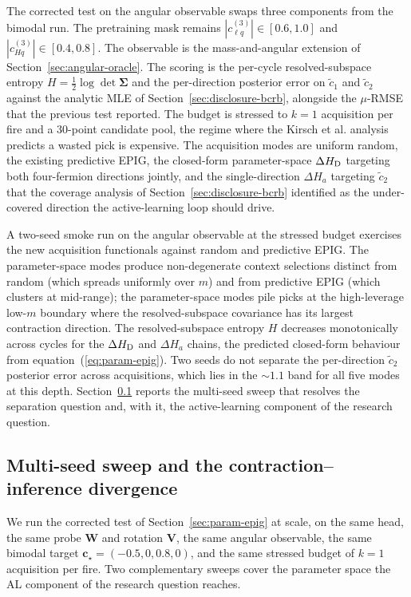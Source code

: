 \documentclass[11pt,a4paper]{article}
\begin{document}
The corrected test on the angular observable swaps three components from the bimodal run. The pretraining mask remains $|c_{\ell q}^{(3)}| \in [0.6, 1.0]$ and $|c_{Hq}^{(3)}| \in [0.4, 0.8]$. The observable is the mass-and-angular extension of Section~\ref{sec:angular-oracle}. The scoring is the per-cycle resolved-subspace entropy $H = \tfrac{1}{2}\log\det\bm{\Sigma}$ and the per-direction posterior error on $\tilde{c}_1$ and $\tilde{c}_2$ against the analytic MLE of Section~\ref{sec:disclosure-bcrb}, alongside the $\mu$-RMSE that the previous test reported. The budget is stressed to $k = 1$ acquisition per fire and a $30$-point candidate pool, the regime where the Kirsch et al. analysis predicts a wasted pick is expensive. The acquisition modes are uniform random, the existing predictive EPIG, the closed-form parameter-space $\Delta H_{\rm D}$ targeting both four-fermion directions jointly, and the single-direction $\Delta H_a$ targeting $\tilde{c}_2$ that the coverage analysis of Section~\ref{sec:disclosure-bcrb} identified as the under-covered direction the active-learning loop should drive.

A two-seed smoke run on the angular observable at the stressed budget exercises the new acquisition functionals against random and predictive EPIG. The parameter-space modes produce non-degenerate context selections distinct from random (which spreads uniformly over $m$) and from predictive EPIG (which clusters at mid-range); the parameter-space modes pile picks at the high-leverage low-$m$ boundary where the resolved-subspace covariance has its largest contraction direction. The resolved-subspace entropy $H$ decreases monotonically across cycles for the $\Delta H_{\rm D}$ and $\Delta H_a$ chains, the predicted closed-form behaviour from equation~(\ref{eq:param-epig}). Two seeds do not separate the per-direction $\tilde{c}_2$ posterior error across acquisitions, which lies in the $\sim 1.1$ band for all five modes at this depth. Section~\ref{sec:al-sweep} reports the multi-seed sweep that resolves the separation question and, with it, the active-learning component of the research question.

\subsection{Multi-seed sweep and the contraction--inference divergence}
\label{sec:al-sweep}

We run the corrected test of Section~\ref{sec:param-epig} at scale, on the same head, the same probe $\bm{W}$ and rotation $\bm{V}$, the same angular observable, the same bimodal target $\bm{c}_\star = (-0.5, 0, 0.8, 0)$, and the same stressed budget of $k=1$ acquisition per fire. Two complementary sweeps cover the parameter space the AL component of the research question reaches.
\end{document}
